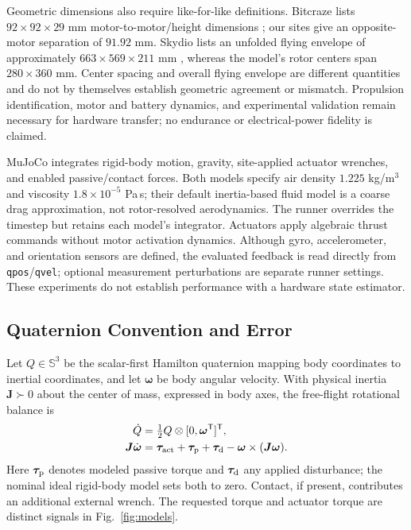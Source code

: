 \documentclass[letterpaper,10pt,conference]{IEEEtran}
\newcommand{\T}{^{\mathsf T}}
\begin{document}
Geometric dimensions also require like-for-like definitions. Bitcraze
lists $92\times92\times29$ mm motor-to-motor/height dimensions
\cite{bitcrazeCF20Specs}; our sites give an opposite-motor separation of
$91.92$ mm. Skydio lists an unfolded flying envelope of approximately
$663\times569\times211$ mm \cite{skydioX2ESpecs}, whereas the model's rotor
centers span $280\times360$ mm. Center spacing and overall flying envelope
are different quantities and do not by themselves establish geometric
agreement or mismatch. Propulsion identification, motor and battery
dynamics, and experimental validation remain necessary for hardware
transfer; no endurance or electrical-power fidelity is claimed.

MuJoCo \cite{todorov2012mujoco} integrates rigid-body motion, gravity, site-applied actuator
wrenches, and enabled passive/contact forces. Both models specify air
density $1.225$ kg/m$^3$ and viscosity $1.8\times10^{-5}$ Pa\,s; their
default inertia-based fluid model \cite{mujocoFluid} is a coarse drag approximation, not
rotor-resolved aerodynamics. The runner overrides the timestep but retains
each model's integrator. Actuators apply algebraic thrust commands without
motor activation dynamics. Although gyro, accelerometer, and orientation
sensors are defined, the evaluated feedback is read directly from
\texttt{qpos}/\texttt{qvel}; optional measurement perturbations are separate
runner settings. These experiments do not establish performance with a
hardware state estimator.

%

\subsection{Quaternion Convention and Error}
Let $Q\in\mathbb S^3$ be the scalar-first Hamilton quaternion mapping body
coordinates to inertial coordinates, and let $\bm\omega$ be body angular
velocity. With physical inertia $\bm J\succ0$ about the center of mass,
expressed in body axes, the free-flight rotational balance is
\begin{align}
 \dot Q&=\tfrac12 Q\otimes[0,\bm\omega\T]\T,\\
 \bm J\dot{\bm\omega}&=\bm\tau_{\rm act}+\bm\tau_{\rm p}
       +\bm\tau_{\rm d}-\bm\omega\times(\bm J\bm\omega).
 \label{eq:plant}
\end{align}
Here $\bm\tau_{\rm p}$ denotes modeled passive torque and
$\bm\tau_{\rm d}$ any applied disturbance; the nominal ideal rigid-body
model sets both to zero. Contact, if present, contributes an additional
external wrench. The requested torque and actuator torque are distinct
signals in Fig.~\ref{fig:models}.
\end{document}
